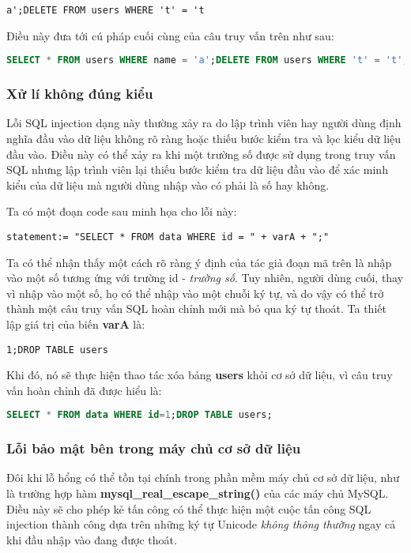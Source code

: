 \documentclass[../main-report.tex]{subfiles}
\begin{document}
\begin{lstlisting}
a';DELETE FROM users WHERE 't' = 't
\end{lstlisting}


Điều này đưa tới cú pháp cuối cùng của câu truy vấn trên như sau:

\begin{lstlisting}[language=SQL]
SELECT * FROM users WHERE name = 'a';DELETE FROM users WHERE 't' = 't';
\end{lstlisting}

\subsubsection*{Xử lí không đúng kiểu}
Lỗi SQL injection dạng này thường xảy ra do lập trình viên hay người dùng định nghĩa đầu vào dữ liệu không rõ ràng hoặc thiếu bước kiểm tra và lọc kiểu dữ liệu đầu vào. Điều này có thể xảy ra khi một trường số được sử dụng trong truy vấn SQL nhưng lập trình viên lại thiếu bước kiểm tra dữ liệu đầu vào để xác minh kiểu của dữ liệu mà người dùng nhập vào có phải là số hay không.

\begin{example}
Ta có một đoạn code sau minh họa cho lỗi này:

\begin{lstlisting}
statement:= "SELECT * FROM data WHERE id = " + varA + ";"
\end{lstlisting}
\end{example}

Ta có thể nhận thấy một cách rõ ràng ý định của tác giả đoạn mã trên là nhập vào một số tương ứng với trường id - \emph{trường số}. Tuy nhiên, người dùng cuối, thay vì nhập vào một số, họ có thể nhập vào một chuỗi ký tự, và do vậy có thể trở thành một câu truy vấn SQL hoàn chỉnh mới mà bỏ qua ký tự thoát. Ta thiết lập giá trị của biến \textbf{varA} là:

\begin{lstlisting}
1;DROP TABLE users
\end{lstlisting}

Khi đó, nó sẽ thực hiện thao tác xóa bảng \textbf{users} khỏi cơ sở dữ liệu, vì câu truy vấn hoàn chỉnh đã được hiểu là:

\begin{lstlisting}[language=SQL]
SELECT * FROM data WHERE id=1;DROP TABLE users;
\end{lstlisting}

\subsubsection*{Lỗi bảo mật bên trong máy chủ cơ sở dữ liệu}
Đôi khi lỗ hổng có thể tồn tại chính trong phần mềm máy chủ cơ sở dữ liệu, như là trường hợp hàm \textbf{mysql\_real\_escape\_string()} của các máy chủ MySQL. Điều này sẽ cho phép kẻ tấn công có thể thực hiện một cuộc tấn công SQL injection thành công dựa trên những ký tự Unicode \emph{không thông thường} ngay cả khi đầu nhập vào đang được thoát.
\end{document}
